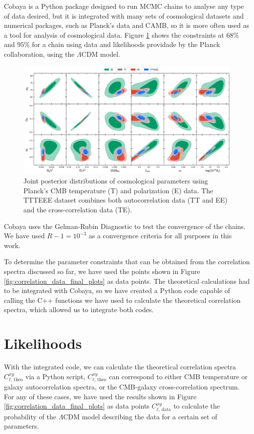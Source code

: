 \documentclass[openany,a4paper,12pt,oneside]{book}
\begin{document}
\begin{spacing}{1.5}
Cobaya is a Python package designed to run MCMC chains to analyse any type of data desired, but it is integrated with many sets of cosmological datasets and numerical packages, such as Planck's data and CAMB, so it is more often used as a tool for analysis of cosmological data. Figure \ref{fig:cobaya_test} shows the constraints at $68\%$ and $95\%$ for a chain using data and likelihoods providade by the Planck collaboration, using the $\Lambda$CDM model.

\begin{figure}[!htb]
	\centering
	\includegraphics[width=\linewidth]{Imagens/compare_likelihoods.png}
	\caption{Joint posterior distributions of cosmological parameters using Planck's CMB temperature (T) and polarization (E) data. The TTTEEE dataset combines both autocorrelation data (TT and EE) and the cross-correlation data (TE).}
	\label{fig:cobaya_test}
\end{figure}

Cobaya uses the Gelman-Rubin Diagnostic\cite{Rminus1_paper92} to test the convergence of the chains. We have used $R-1=10^{-3}$ as a convergence criteria for all purposes in this work.

To determine the parameter constraints that can be obtained from the correlation spectra discussed so far, we have used the points shown in Figure \ref{fig:correlation_data_final_plots} as data points. The theoretical calculations had to be integrated with Cobaya, so we have created a Python code capable of calling the C++ functions we have used to calculate the theoretical correlation spectra, which allowed us to integrate both codes. 

\section{Likelihoods}

With the integrated code, we can calculate the theoretical correlation spectra $C_{\ell\text{, theo}}^{xy}$ via a Python script, $C_{\ell\text{, theo}}^{xy}$ can correspond to either CMB temperature or galaxy autocorrelation spectra, or the CMB-galaxy cross-correlation spectrum. For any of these cases, we have used the results shown in Figure \ref{fig:correlation_data_final_plots} as data points $C_{\ell\text{, data}}^{xy}$ to calculate the probability of the $\Lambda$CDM model describing the data for a certain set of parameters. 


\end{spacing}
\end{document}
